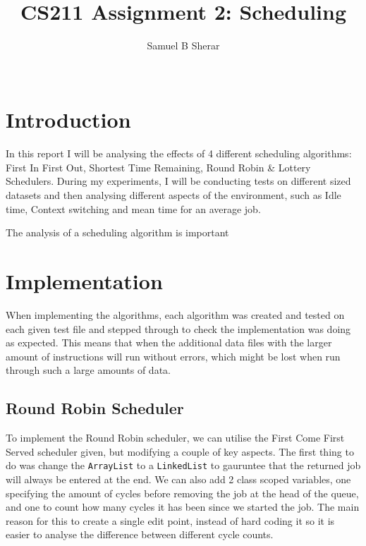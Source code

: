 \documentclass{acm_proc_article-sp}
\begin{document}
\title{CS211 Assignment 2: Scheduling}
\author{
  \alignauthor 
  Samuel B Sherar\\
  \
}

\maketitle

\section{Introduction}
In this report I will be analysing the effects of 4 different scheduling algorithms: First In First Out, Shortest Time Remaining, Round Robin \& Lottery Schedulers. During my experiments, I will be conducting tests on different sized datasets and then analysing different aspects of the environment, such as Idle time, Context switching and mean time for an average job.

The analysis of a scheduling algorithm is important 

\section{Implementation}

When implementing the algorithms, each algorithm was created and tested on each given test file and stepped through to check the implementation was doing as expected. This means that when the additional data files with the larger amount of instructions will run without errors, which might be lost when run through such a large amounts of data.

\subsection{Round Robin Scheduler}

To implement the Round Robin scheduler, we can utilise the First Come First Served scheduler given, but modifying a couple of key aspects. The first thing to do was change the \texttt{ArrayList} to a \texttt{LinkedList} to gauruntee that the returned job will always be entered at the end. We can also add 2 class scoped variables, one specifying the amount of cycles before removing the job at the head of the queue, and one to count how many cycles it has been since we started the job. The main reason for this to create a single edit point, instead of hard coding it so it is easier to analyse the difference between different cycle counts.
\end{document}
